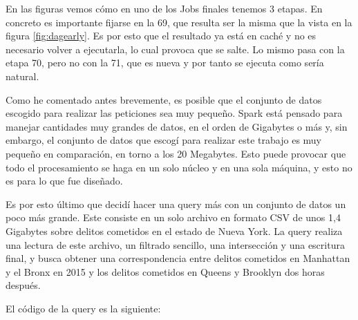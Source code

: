 \documentclass[12pt,twoside,titlepage]{report}
\begin{document}
En las figuras vemos cómo en uno de los Jobs finales tenemos 3 etapas. En concreto es importante fijarse en la 69, que resulta ser la misma que la vista en la figura \ref{fig:dagearly}. Es por esto que el resultado ya está en caché y no es necesario volver a ejecutarla, lo cual provoca que se salte. Lo mismo pasa con la etapa 70, pero no con la 71, que es nueva y por tanto se ejecuta como sería natural.

Como he comentado antes brevemente, es posible que el conjunto de datos escogido para realizar las peticiones sea muy pequeño. Spark está pensado para manejar cantidades muy grandes de datos, en el orden de Gigabytes o más y, sin embargo, el conjunto de datos que escogí para realizar este trabajo es muy pequeño en comparación, en torno a los 20 Megabytes. Esto puede provocar que todo el procesamiento se haga en un solo núcleo y en una sola máquina, y esto no es para lo que fue diseñado.

Es por esto último que decidí hacer una query más con un conjunto de datos un poco más grande. Este consiste en un solo archivo en formato CSV de unos 1,4 Gigabytes sobre delitos cometidos en el estado de Nueva York. La query realiza una lectura de este archivo, un filtrado sencillo, una intersección y una escritura final, y busca obtener una correspondencia entre delitos cometidos en Manhattan y el Bronx en 2015 y los delitos cometidos en Queens y Brooklyn dos horas después.

El código de la query es la siguiente:
\end{document}
